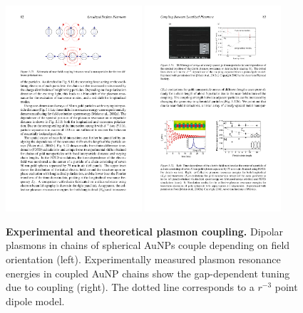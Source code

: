 \documentclass{article}
\begin{document}
\begin{figure}[bt]
\centering
\includegraphics[width=0.45\textwidth]{figures/literature/maier_plasmonics_coupling_diagram}
\quad
\includegraphics[width=0.45\textwidth]{figures/literature/maier_plasmonics_coupling}
\caption[Experimental and theoretical plasmon coupling]{\textbf{Experimental and theoretical plasmon coupling.} Dipolar plasmons in chains of spherical AuNPs couple depending on field orientation \cite{maier2007plasmonics} (left). Experimentally measured plasmon resonance energies in coupled AuNP chains show the gap-dependent tuning due to coupling \cite{maier2002} (right). The dotted line corresponds to a $r^{-3}$ point dipole model.}
\label{fig:maier_plasmon_coupling}
\end{figure}
\end{document}
